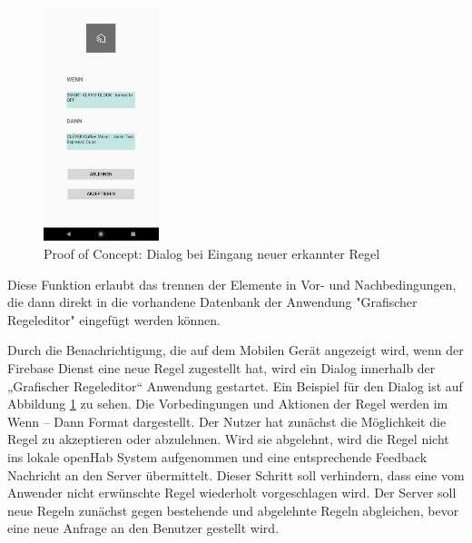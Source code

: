 \begin{figure}
  \begin{center}
    \includegraphics[width=0.3\textwidth]{figures/Appbildungen/newRuleDialog.png}
  \end{center}
  \label{fig:dialog}
  \caption{Proof of Concept: Dialog bei Eingang neuer erkannter Regel}
\end{figure}
\normalsize

Diese Funktion erlaubt das trennen der Elemente in Vor- und Nachbedingungen, die dann direkt in die vorhandene Datenbank der Anwendung "Grafischer Regeleditor" eingefügt werden können.

Durch die Benachrichtigung, die auf dem Mobilen Gerät angezeigt wird, wenn der Firebase Dienst eine neue Regel zugestellt hat, wird ein Dialog innerhalb der „Grafischer Regeleditor“ Anwendung gestartet. Ein Beispiel für den Dialog ist auf Abbildung \ref{fig:dialog} zu sehen. Die Vorbedingungen und Aktionen der Regel werden im Wenn – Dann Format dargestellt. Der Nutzer hat zunächst die Möglichkeit die Regel zu akzeptieren oder abzulehnen. Wird sie abgelehnt, wird die Regel nicht ins lokale openHab System aufgenommen und eine entsprechende Feedback Nachricht an den Server übermittelt. Dieser Schritt soll verhindern, dass eine vom Anwender nicht erwünschte Regel wiederholt vorgeschlagen wird. Der Server soll neue Regeln zunächst gegen bestehende und abgelehnte Regeln abgleichen, bevor eine neue Anfrage an den Benutzer gestellt wird.

